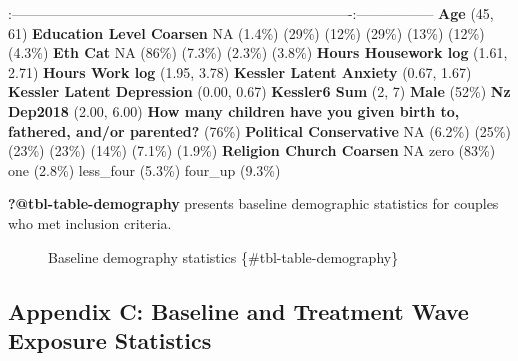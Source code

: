 \documentclass[
  singlecolumn]{article}
\begin{document}
\textbar:-------------------------------------------------------------------------\textbar:-----------------\textbar{}
\textbar{}\textbf{Age}  (45, 61) \textbar{}
\textbar{}\textbf{Education Level Coarsen} \textbar NA \textbar{}
  (1.4\%) \textbar{}   (29\%)
\textbar{}   (12\%) \textbar{}  
(29\%) \textbar{}   (13\%) \textbar{} 
 (12\%) \textbar{}   (4.3\%) \textbar{}
\textbar{}\textbf{Eth Cat} \textbar NA \textbar{}  
(86\%) \textbar{}   (7.3\%) \textbar{} 
 (2.3\%) \textbar{}   (3.8\%) \textbar{}
\textbar{}\textbf{Hours Housework log}  (1.61, 2.71)
\textbar{} \textbar{}\textbf{Hours Work log}  (1.95, 3.78)
\textbar{} \textbar{}\textbf{Kessler Latent Anxiety}  (0.67,
1.67) \textbar{} \textbar{}\textbf{Kessler Latent Depression}
 (0.00, 0.67) \textbar{} \textbar{}\textbf{Kessler6 Sum}
 (2, 7) \textbar{} \textbar{}\textbf{Male}  (52\%)
\textbar{} \textbar{}\textbf{Nz Dep2018}  (2.00, 6.00)
\textbar{} \textbar{}\textbf{How many children have you given birth to,
fathered, and/or parented?}  (76\%) \textbar{}
\textbar{}\textbf{Political Conservative} \textbar NA \textbar{}
  (6.2\%) \textbar{}   (25\%)
\textbar{}   (23\%) \textbar{}  
(23\%) \textbar{}   (14\%) \textbar{} 
 (7.1\%) \textbar{}   (1.9\%) \textbar{}
\textbar{}\textbf{Religion Church Coarsen} \textbar NA \textbar{}
\textbar zero  (83\%) \textbar{} \textbar one 
(2.8\%) \textbar{} \textbar less\_four  (5.3\%) \textbar{}
\textbar four\_up  (9.3\%) \textbar{}

\begin{description}
\item[\textbf{?@tbl-table-demography} presents baseline demographic
statistics for couples who met inclusion criteria.]
Baseline demography statistics \{\#tbl-table-demography\}
\end{description}

\subsection{Appendix C: Baseline and Treatment Wave Exposure
Statistics}\label{appendix-exposures}
\end{document}
